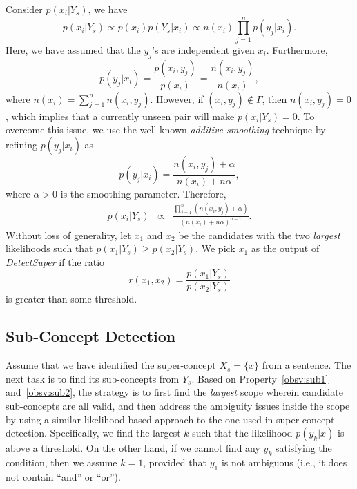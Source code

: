 \documentclass[10pt,journal,cspaper,compsoc]{IEEEtran}
\begin{document}
Consider $p(x_i|Y_s)$, we have
\begin{equation}
p(x_i|Y_s)\propto p(x_i)p(Y_s|x_i)\propto n(x_i)\prod_{j=1}^{n}p(y_j|x_i).
\end{equation}
Here, we have assumed that the $y_j$'s are independent given $x_i$. Furthermore,
\begin{equation}
p(y_j|x_i)=\frac{p(x_i,y_j)}{p(x_i)}=\frac{n(x_i,y_j)}{n(x_i)},
\end{equation}
where $n(x_i)=\sum_{j=1}^{n}n(x_i,y_j)$. However, if $(x_i,y_j)\not\in\Gamma$, then $n(x_i, y_j)=0$, which implies that a currently unseen pair will make $p(x_i|Y_s)=0$. To overcome this issue, we use the well-known \emph{additive smoothing} technique by refining $p(y_j|x_i)$ as
\begin{equation}
p(y_j|x_i)=\frac{n(x_i,y_j)+\alpha}{n(x_i)+n\alpha},
\end{equation}
where $\alpha>0$ is the smoothing parameter. Therefore,
\begin{eqnarray} \label{eq:bayes-llh}
p(x_i|Y_s)&\propto&\frac{\prod_{j=1}^{n}(n(x_i,y_j)+\alpha)}{(n(x_i)+n\alpha)^{n-1}}.
\end{eqnarray}
Without loss of generality, let $x_1$ and $x_2$ be the candidates with the two \emph{largest} likelihoods such that $p(x_1|Y_s)\geq p(x_2|Y_s)$. We pick $x_1$ as the output of \emph{DetectSuper} if the ratio
\begin{equation}
r(x_1, x_2)=\frac{p(x_1|Y_s)}{p(x_2|Y_s)}
\end{equation}
is greater than some threshold.

\subsection{Sub-Concept Detection}\label{sec:extract:sub-detect}

Assume that we have identified the super-concept $X_s=\{x\}$ from a sentence. The next task is to find its sub-concepts from $Y_s$. Based on Property~\ref{obsv:sub1} and~\ref{obsv:sub2}, the strategy is to first find the \emph{largest} scope wherein candidate sub-concepts are all valid, and then address the ambiguity issues inside the scope by using a similar likelihood-based approach to the one used in super-concept detection. Specifically, we find the largest $k$ such that the likelihood
$p(y_k|x)$ is above a threshold. On the other hand, if we cannot find any $y_k$ satisfying the condition, then
we assume $k=1$, provided that $y_1$ is not ambiguous (i.e., it
does not contain ``and'' or ``or'').
\end{document}
